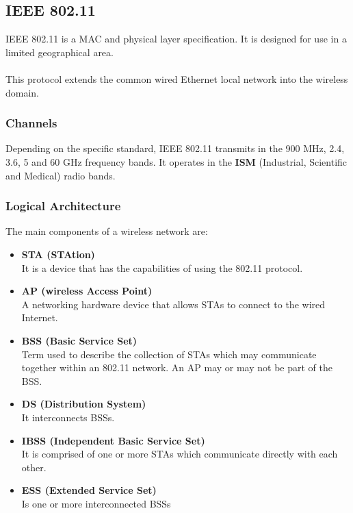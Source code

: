 \documentclass{article}
\begin{document}
\subsection{IEEE 802.11}
IEEE 802.11 is a MAC and physical layer specification. It is designed for use in a limited geographical area. \\ \\
This protocol extends the common wired Ethernet local network into the wireless domain.

\subsubsection{Channels}
Depending on the specific standard, IEEE 802.11 transmits in the 900 MHz, 2.4, 3.6, 5 and 60 GHz frequency bands. It operates in the \textbf{ISM} (Industrial, Scientific and Medical) radio bands.

\subsubsection{Logical Architecture}
The main components of a wireless network are:

\begin{itemize}
	\item \textbf{STA (STAtion)}
	\vspace{.2cm} \\
	It is a device that has the capabilities of using the 802.11 protocol.
	
	\item \textbf{AP (wireless Access Point)}
	\vspace{.2cm} \\
	A networking hardware device that allows STAs to connect to the wired Internet.
	
	\item \textbf{BSS (Basic Service Set)}
	\vspace{.2cm} \\
	Term used to describe the collection of STAs which may communicate together within an 802.11 network. An AP may or may not be part of the BSS.
	
	\item \textbf{DS (Distribution System)}
	\vspace{.2cm} \\
	It interconnects BSSs.
	
	\item \textbf{IBSS (Independent Basic Service Set)}
	\vspace{.2cm} \\
	It is comprised of one or more STAs which communicate directly with each other.
	
	\item \textbf{ESS (Extended Service Set)}
	\vspace{.2cm} \\
	Is one or more interconnected BSSs
\end{itemize}
\end{document}
